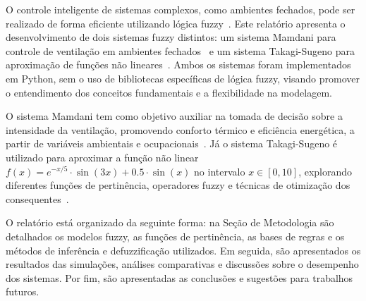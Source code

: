 O controle inteligente de sistemas complexos, como ambientes fechados, pode ser realizado de forma eficiente utilizando lógica fuzzy~\cite{zadeh1965fuzzy,ross2010fuzzy}. Este relatório apresenta o desenvolvimento de dois sistemas fuzzy distintos: um sistema Mamdani para controle de ventilação em ambientes fechados~\cite{mamdani1975experiment,ross2010fuzzy} e um sistema Takagi-Sugeno para aproximação de funções não lineares~\cite{takagi1985fuzzy,sugeno1985industrial}. Ambos os sistemas foram implementados em Python, sem o uso de bibliotecas específicas de lógica fuzzy, visando promover o entendimento dos conceitos fundamentais e a flexibilidade na modelagem.

O sistema Mamdani tem como objetivo auxiliar na tomada de decisão sobre a intensidade da ventilação, promovendo conforto térmico e eficiência energética, a partir de variáveis ambientais e ocupacionais~\cite{ross2010fuzzy}. Já o sistema Takagi-Sugeno é utilizado para aproximar a função não linear $f(x) = e^{-x/5} \cdot \sin(3x) + 0.5 \cdot \sin(x)$ no intervalo $x \in [0, 10]$, explorando diferentes funções de pertinência, operadores fuzzy e técnicas de otimização dos consequentes~\cite{takagi1985fuzzy}.

O relatório está organizado da seguinte forma: na Seção de Metodologia são detalhados os modelos fuzzy, as funções de pertinência, as bases de regras e os métodos de inferência e defuzzificação utilizados. Em seguida, são apresentados os resultados das simulações, análises comparativas e discussões sobre o desempenho dos sistemas. Por fim, são apresentadas as conclusões e sugestões para trabalhos futuros.

